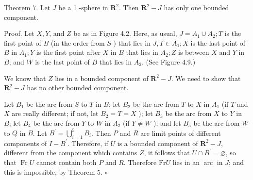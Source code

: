 Theorem 7. Let $J$ be a 1 -sphere in $\mathbf{R}^{2}$. Then $\mathbf{R}^{2}-J$ has only one bounded component.

Proof. Let $X, Y$, and $Z$ be as in Figure 4.2. Here, as usual, $J=A_{1} \cup A_{2} ; T$ is the first point of $B$ (in the order from $S$ ) that lies in $J, T \in A_{1} ; X$ is the last point of $B$ in $A_{1} ; Y$ is the first point after $X$ in $B$ that lies in $A_{2} ; Z$ is between $X$ and $Y$ in $B$; and $W$ is the last point of $B$ that lies in $A_{2}$. (See Figure 4.9.)

\begin{center}
\end{center}


We know that $Z$ lies in a bounded component of $\mathbf{R}^{2}-J$. We need to show that $\mathbf{R}^{2}-J$ has no other bounded component.

Let $B_{1}$ be the arc from $S$ to $T$ in $B$; let $B_{2}$ be the arc from $T$ to $X$ in $A_{1}$ (if $T$ and $X$ are really different; if not, let $B_{2}=T=X$ ); let $B_{3}$ be the arc from $X$ to $Y$ in $B$; let $B_{4}$ be the arc from $Y$ to $W$ in $A_{2}$ (if $Y \neq W$ ); and let $B_{5}$ be the arc from $W$ to $Q$ in $B$. Let $B^{\prime}=\bigcup_{i=1}^{5} B_{i}$. Then $P$ and $R$ are limit points of different components of $I-B^{\prime}$. Therefore, if $U$ is a bounded component of $\mathbf{R}^{2}-J$, different from the component which contains $Z$, it follows that $U \cap B^{\prime}=\varnothing$, so that $\operatorname{Fr} U$ cannot contain both $P$ and $R$. Therefore $\mathrm{Fr} U$ lies in an $\operatorname{arc}$ in $J$; and this is impossible, by Theorem 5. \(\square\)
